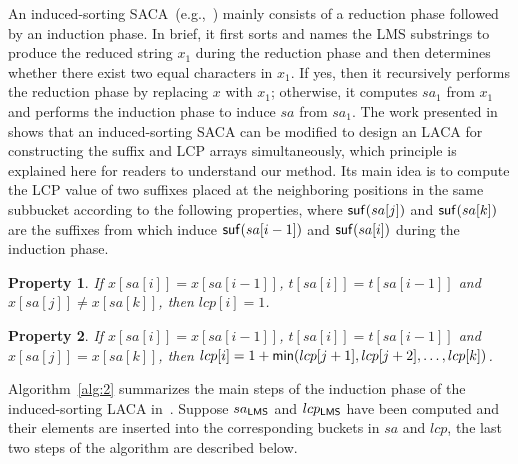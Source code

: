 \documentclass[10pt,journal,compsoc]{IEEEtran}
\newtheorem{Property}{Property}
\begin{document}
	An induced-sorting SACA~(e.g.,~\cite{Nong11}) mainly consists of a reduction phase followed by an induction phase. In brief, it first sorts and names the LMS substrings to produce the reduced string $x_1$ during the reduction phase and then determines whether there exist two equal characters in $x_1$. If yes, then it recursively performs the reduction phase by replacing $x$ with $x_1$; otherwise, it computes $sa_1$ from $x_1$ and performs the induction phase to induce $sa$ from $sa_1$. The work presented in~\cite{Fischer11} shows that an induced-sorting SACA can be modified to design an LACA for constructing the suffix and LCP arrays simultaneously, which principle is explained here for readers to understand our method. Its main idea is to compute the LCP value of two suffixes placed at the neighboring positions in the same subbucket according to the following properties, where ${\sf suf}(sa[j])$ and ${\sf suf}(sa[k])$ are the suffixes from which induce ${\sf suf}(sa[i - 1])$ and ${\sf suf}(sa[i])$ during the induction phase.
	
	\begin{Property} \label{property:1}
		If $x[sa[i]] = x[sa[i - 1]]$, $t[sa[i]] = t[sa[i - 1]]$ and $x[sa[j]] \ne x[sa[k]]$, then $lcp[i] = 1$.
		
	\end{Property}
	
	\begin{Property} \label{property:2}
		If $x[sa[i]] = x[sa[i - 1]]$, $t[sa[i]] = t[sa[i - 1]]$ and $x[sa[j]] = x[sa[k]]$, then $lcp[i] = 1 + {\sf min}(lcp[j + 1], lcp[j + 2], \dots, lcp[k])$.
		
	\end{Property}
	
	Algorithm~\ref{alg:2} summarizes the main steps of the induction phase of the induced-sorting LACA in~\cite{Fischer11}. Suppose ${sa_{\sf LMS}}$ and $lcp_{\sf LMS}$ have been computed and their elements are inserted into the corresponding buckets in $sa$ and $lcp$, the last two steps of the algorithm are described below.
	
\end{document}
